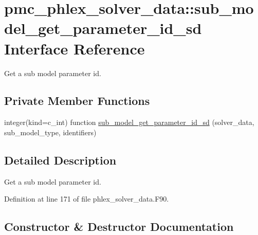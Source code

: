 \hypertarget{interfacepmc__phlex__solver__data_1_1sub__model__get__parameter__id__sd}{}\section{pmc\+\_\+phlex\+\_\+solver\+\_\+data\+:\+:sub\+\_\+model\+\_\+get\+\_\+parameter\+\_\+id\+\_\+sd Interface Reference}
\label{interfacepmc__phlex__solver__data_1_1sub__model__get__parameter__id__sd}


Get a sub model parameter id.  


\subsection*{Private Member Functions}
\begin{DoxyCompactItemize}
\item 
integer(kind=c\+\_\+int) function \mbox{\hyperlink{interfacepmc__phlex__solver__data_1_1sub__model__get__parameter__id__sd_ae6aece3ee036fd9c2d73296417139a62}{sub\+\_\+model\+\_\+get\+\_\+parameter\+\_\+id\+\_\+sd}} (solver\+\_\+data, sub\+\_\+model\+\_\+type, identifiers)
\end{DoxyCompactItemize}


\subsection{Detailed Description}
Get a sub model parameter id. 

Definition at line 171 of file phlex\+\_\+solver\+\_\+data.\+F90.



\subsection{Constructor \& Destructor Documentation}
\mbox{\label{interfacepmc__phlex__solver__data_1_1sub__model__get__parameter__id__sd_ae6aece3ee036fd9c2d73296417139a62}} 
